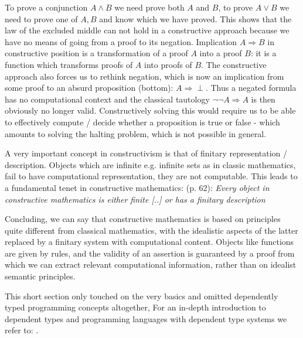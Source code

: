 To prove a conjunction $A \land B$ we need prove both $A$ and $B$, to prove $A \lor B$ we need to prove one of $A, B$ and know which we have proved. This shows that the law of the excluded middle can not hold in a constructive approach because we have no means of going from a proof to its negation. Implication $A \Rightarrow B$ in constructive position is a transformation of a proof $A$ into a proof $B$: it is a function which transforms proofs of $A$ into proofs of $B$. The constructive approach also forces us to rethink negation, which is now an implication from some proof to an absurd proposition (bottom): $A \Rightarrow \perp$. Thus a negated formula has no computational context and the classical tautology $\neg \neg A \Rightarrow A$ is then obviously no longer valid.  Constructively solving this would require us to be able to effectively compute / decide whether a proposition is true or false - which amounts to solving the halting problem, which is not possible in general.

A very important concept in constructivism is that of finitary representation / description. Objects which are infinite e.g. infinite sets as in classic mathematics, fail to have computational representation, they are not computable. This leads to a fundamental tenet in constructive mathematics: \cite{thompson_type_1991} (p. 62): \textit{Every object in constructive mathematics is either finite [..] or has a finitary description}

Concluding, we can say that constructive mathematics is based on principles quite different from classical mathematics, with the idealistic aspects of the latter replaced by a finitary system with computational content. Objects like functions are given by rules, and the validity of an assertion is guaranteed by a proof from which we can extract relevant computational information, rather than on idealist semantic principles. 

This short section only touched on the very basics and omitted dependently typed programming concepts altogether, For an in-depth introduction to dependent types and programming languages with dependent type systems we refer to: \cite{brady_type-driven_2017, pierce_programming_2018, program_homotopy_2013, stump_verified_2016, thompson_type_1991}.


